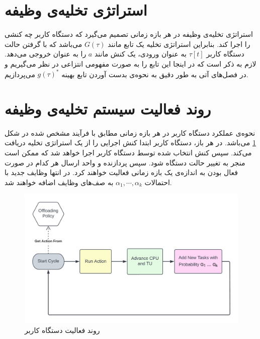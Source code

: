\section{استراتژی تخلیه‌ی وظیفه}
استراتژی تخلیه‌ی وظیفه در هر بازه زمانی تصمیم می‌گیرد که دستگاه کاربر چه کنشی را اجرا کند. بنابراین استراتژی تخلیه یک تابع مانند $G(\tau)$ می‌باشد که با گرفتن حالت دستگاه کاربر $\tau[t]$ به عنوان ورودی، یک کنش مانند \(a\) را به عنوان خروجی می‌دهد. لازم به ذکر است که در اینجا این تابع را به صورت مفهومی انتزاعی در نظر می‌گیریم و در فصل‌های آتی به طور دقیق به نحوه‌ی بدست آوردن تابع بهینه $g(\tau)^{*}$ می‌پردازیم.
\newpage
\section{روند فعالیت سیستم تخلیه‌ی وظیفه}
نحوه‌ی عملکرد دستگاه کاربر در هر بازه زمانی مطابق با فرآیند مشخص شده در شکل \ref{fig:ueproc} می‌باشد. در هر باز، دستگاه کاربر ابتدا کنش اجرایی را از یک استراتژی تخلیه دریافت می‌کند. سپس کنش انتخاب شده توسط دستگاه کاربر اجرا خواهد شد که ممکن است منجر به تغییر حالت دستگاه شود. سپس پردازنده و واحد ارسال هر کدام در صورت فعال بودن به اندازه‌ی یک بازه زمانی فعالیت خواهند کرد. در انتها وظایف جدید با احتمالات
$\alpha_1, \cdots, \alpha_k$
به صف‌های وظایف اضافه خواهند شد.


\begin{figure}[H]
	\centering
	\includegraphics[width=\textwidth]{figures/ueproc.png}
	\caption{روند فعالیت دستگاه کاربر}
	\label{fig:ueproc}
\end{figure}